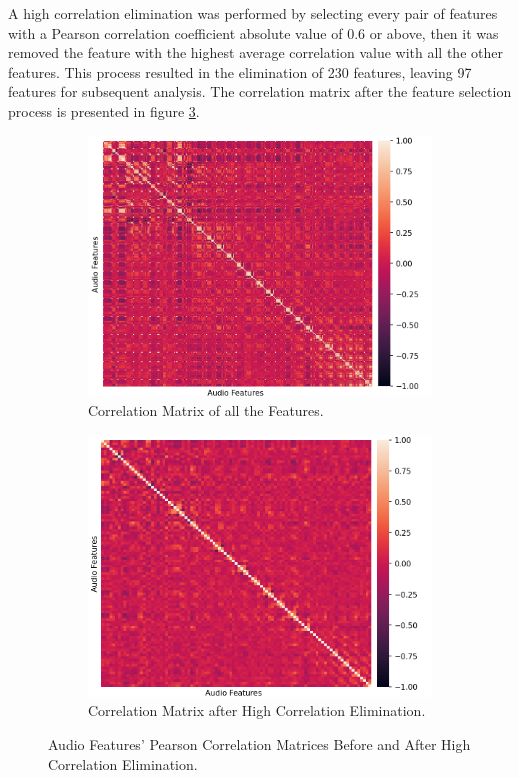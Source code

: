 A high correlation elimination was performed by selecting every pair of features with a Pearson correlation coefficient absolute value of 0.6 or above, then it was removed the feature with the highest average correlation value with all the other features. This process resulted in the elimination of 230 features, leaving 97 features for subsequent analysis. The correlation matrix after the feature selection process is presented in figure \ref{fig:highAudioFeat}.

\begin{figure}
	\centering
	\begin{subfigure}{.5\textwidth}
		\centering
		\includegraphics[width=\linewidth]{figs/4_1_traditional/allCorrMatrix.png}
		\caption{Correlation Matrix of all the Features.}
		\label{fig:allAudioFeat}
	\end{subfigure}%
	\begin{subfigure}{.5\textwidth}
		\centering
		\includegraphics[width=\linewidth]{figs/4_1_traditional/highCorrMatrix.png}
		\caption{Correlation Matrix after High Correlation Elimination.}
		\label{fig:highAudioFeat}
	\end{subfigure}
	\caption{Audio Features' Pearson Correlation Matrices Before and After High Correlation Elimination.}
\end{figure}



